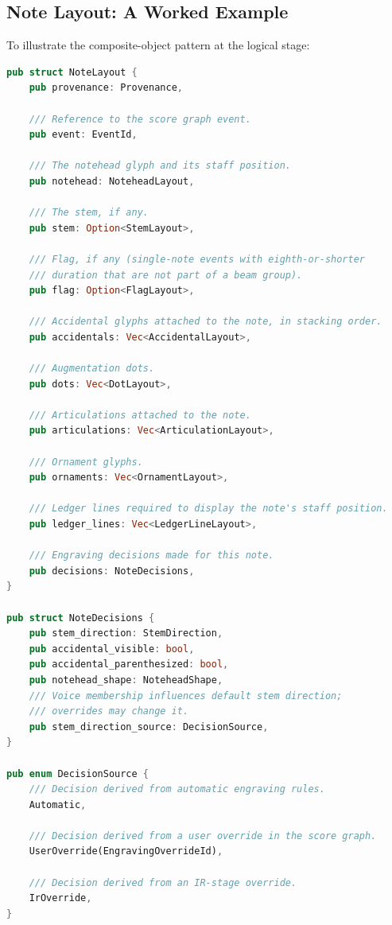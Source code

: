 \documentclass[11pt,letterpaper]{report}
\begin{document}
\subsection{Note Layout: A Worked Example}

To illustrate the composite-object pattern at the logical stage:

\begin{lstlisting}[language=Rust]
pub struct NoteLayout {
    pub provenance: Provenance,

    /// Reference to the score graph event.
    pub event: EventId,

    /// The notehead glyph and its staff position.
    pub notehead: NoteheadLayout,

    /// The stem, if any.
    pub stem: Option<StemLayout>,

    /// Flag, if any (single-note events with eighth-or-shorter
    /// duration that are not part of a beam group).
    pub flag: Option<FlagLayout>,

    /// Accidental glyphs attached to the note, in stacking order.
    pub accidentals: Vec<AccidentalLayout>,

    /// Augmentation dots.
    pub dots: Vec<DotLayout>,

    /// Articulations attached to the note.
    pub articulations: Vec<ArticulationLayout>,

    /// Ornament glyphs.
    pub ornaments: Vec<OrnamentLayout>,

    /// Ledger lines required to display the note's staff position.
    pub ledger_lines: Vec<LedgerLineLayout>,

    /// Engraving decisions made for this note.
    pub decisions: NoteDecisions,
}

pub struct NoteDecisions {
    pub stem_direction: StemDirection,
    pub accidental_visible: bool,
    pub accidental_parenthesized: bool,
    pub notehead_shape: NoteheadShape,
    /// Voice membership influences default stem direction;
    /// overrides may change it.
    pub stem_direction_source: DecisionSource,
}

pub enum DecisionSource {
    /// Decision derived from automatic engraving rules.
    Automatic,

    /// Decision derived from a user override in the score graph.
    UserOverride(EngravingOverrideId),

    /// Decision derived from an IR-stage override.
    IrOverride,
}
\end{lstlisting}
\end{document}
